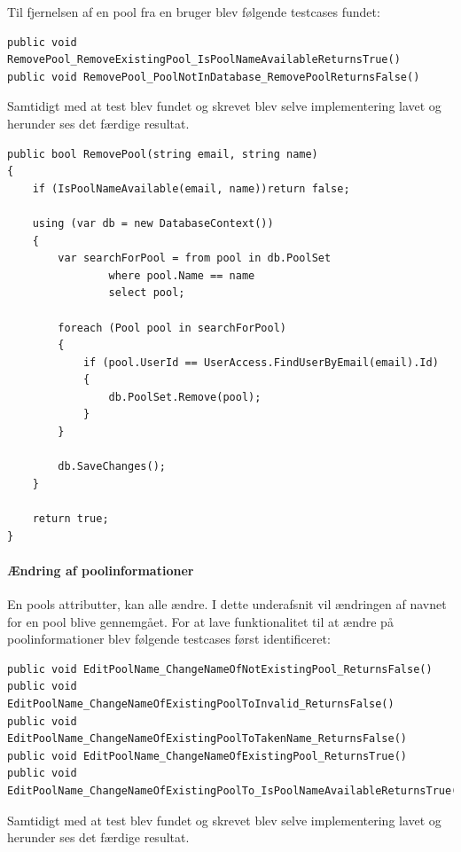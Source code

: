 Til fjernelsen af en pool fra en bruger blev følgende testcases fundet:

\begin{lstlisting}[caption=Testcases til RemovePool metoden]
public void RemovePool_RemoveExistingPool_IsPoolNameAvailableReturnsTrue()
public void RemovePool_PoolNotInDatabase_RemovePoolReturnsFalse()
\end{lstlisting}

Samtidigt med at test blev fundet og skrevet blev selve implementering lavet og herunder ses det færdige resultat.

\begin{lstlisting}[caption=RemovePool metoden]
public bool RemovePool(string email, string name)
{
	if (IsPoolNameAvailable(email, name))return false;
	
	using (var db = new DatabaseContext())
	{
		var searchForPool = from pool in db.PoolSet
				where pool.Name == name
				select pool;
		
		foreach (Pool pool in searchForPool)
		{
			if (pool.UserId == UserAccess.FindUserByEmail(email).Id)
			{
				db.PoolSet.Remove(pool);
			}
		}
	
		db.SaveChanges();
	}
	
	return true;
}
\end{lstlisting}

\paragraph{Ændring af poolinformationer}

En pools attributter, kan alle ændre. I dette underafsnit vil ændringen af navnet for en pool blive gennemgået. For at lave funktionalitet til at ændre på poolinformationer blev følgende testcases først identificeret:

\begin{lstlisting}[caption=Testcases til EditPoolName metoden]
public void EditPoolName_ChangeNameOfNotExistingPool_ReturnsFalse()
public void EditPoolName_ChangeNameOfExistingPoolToInvalid_ReturnsFalse()
public void EditPoolName_ChangeNameOfExistingPoolToTakenName_ReturnsFalse()
public void EditPoolName_ChangeNameOfExistingPool_ReturnsTrue()
public void EditPoolName_ChangeNameOfExistingPoolTo_IsPoolNameAvailableReturnsTrue()                        
\end{lstlisting}

Samtidigt med at test blev fundet og skrevet blev selve implementering lavet og herunder ses det færdige resultat.

